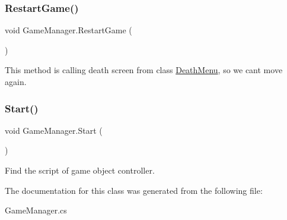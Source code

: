 \subsubsection{\texorpdfstring{Restart\+Game()}{RestartGame()}}
{\footnotesize\ttfamily void Game\+Manager.\+Restart\+Game (\begin{DoxyParamCaption}{ }\end{DoxyParamCaption})}



This method is calling death screen from class \hyperlink{class_death_menu}{Death\+Menu}, so we can\textquotesingle{}t move again. 

\hypertarget{class_game_manager_a5ccfacd027ad08eeb4ff1f25a7f59c98}{}\label{class_game_manager_a5ccfacd027ad08eeb4ff1f25a7f59c98} 
\subsubsection{\texorpdfstring{Start()}{Start()}}
{\footnotesize\ttfamily void Game\+Manager.\+Start (\begin{DoxyParamCaption}{ }\end{DoxyParamCaption})\hspace{0.3cm}{\ttfamily [private]}}



Find the script of game object controller. 



The documentation for this class was generated from the following file\+:\begin{DoxyCompactItemize}
\item 
Game\+Manager.\+cs\end{DoxyCompactItemize}
